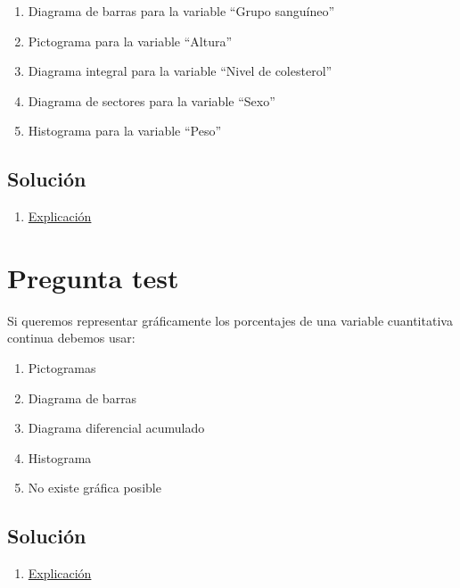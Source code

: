 \documentclass[
]{book}
\providecommand{\tightlist}{%
  \setlength{\itemsep}{0pt}\setlength{\parskip}{0pt}}
\begin{document}
\begin{enumerate}
\def\labelenumi{\alph{enumi})}
\tightlist
\item
  Diagrama de barras para la variable ``Grupo sanguíneo''
\item
  Pictograma para la variable ``Altura''
\item
  Diagrama integral para la variable ``Nivel de colesterol''
\item
  Diagrama de sectores para la variable ``Sexo''
\item
  Histograma para la variable ``Peso''
\end{enumerate}

\hypertarget{soluciuxf3n-25}{%
\subsection{Solución}\label{soluciuxf3n-25}}

\begin{enumerate}
\def\labelenumi{\alph{enumi})}
\setcounter{enumi}{1}
\tightlist
\item
  \href{https://1fjmanzano.github.io/bioestadistica/otros-gra\%CC\%81ficos.html}{Explicación}
\end{enumerate}

\hypertarget{pregunta-test-23}{%
\section{Pregunta test}\label{pregunta-test-23}}

Si queremos representar gráficamente los porcentajes de una variable cuantitativa continua debemos usar:

\begin{enumerate}
\def\labelenumi{\alph{enumi})}
\tightlist
\item
  Pictogramas
\item
  Diagrama de barras
\item
  Diagrama diferencial acumulado
\item
  Histograma
\item
  No existe gráfica posible
\end{enumerate}

\hypertarget{soluciuxf3n-26}{%
\subsection{Solución}\label{soluciuxf3n-26}}

\begin{enumerate}
\def\labelenumi{\alph{enumi})}
\setcounter{enumi}{3}
\tightlist
\item
  \href{https://1fjmanzano.github.io/bioestadistica/histogramas.html}{Explicación}
\end{enumerate}
\end{document}
